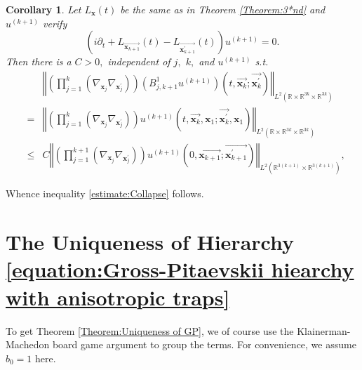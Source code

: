 \documentclass[reqno]{amsart}
\theoremstyle{plain}
\newtheorem{corollary}{Corollary}
\numberwithin{equation}{section}
\begin{document}
\begin{corollary}
Let $L_{\mathbf{x}}(t)$ be the same as in Theorem \ref{Theorem:3*nd} and $u^{(k+1)}$ verify\begin{equation*}
\left( i\partial _{t}+L_{\overrightarrow{\mathbf{x}_{k+1}}}(t)-L_{\overrightarrow{\mathbf{x}_{k+1}^{\prime }}}(t)\right) u^{(k+1)}=0.
\end{equation*}Then there is a $C>0,$ independent of $j,$ $k,$ and $u^{(k+1)}$ s.t. 
\begin{eqnarray*}
&&\left\Vert \left( \prod_{j=1}^{k}\left( \nabla _{\mathbf{x}_{j}}\nabla _{\mathbf{x}_{j}^{\prime }}\right) \right) \left(
B_{j,k+1}^{1}u^{(k+1)}\right) (t,\overrightarrow{\mathbf{x}_{k}};\overrightarrow{\mathbf{x}_{k}^{\prime }})\right\Vert _{L^{2}(\mathbb{R}\times \mathbb{R}^{3k}\times \mathbb{R}^{3k})} \\
&=&\left\Vert \left( \prod_{j=1}^{k}\left( \nabla _{\mathbf{x}_{j}}\nabla _{\mathbf{x}_{j}^{\prime }}\right) \right) u^{(k+1)}(t,\overrightarrow{\mathbf{x}_{k}},\mathbf{x}_{1};\overrightarrow{\mathbf{x}_{k}^{\prime }},\mathbf{x}_{1})\right\Vert _{L^{2}(\mathbb{R}\times \mathbb{R}^{3k}\times \mathbb{R}^{3k})} \\
&\leqslant &C\left\Vert \left( \prod_{j=1}^{k+1}\left( \nabla _{\mathbf{x}_{j}}\nabla _{\mathbf{x}_{j}^{\prime }}\right) \right) u^{(k+1)}(0,\overrightarrow{\mathbf{x}_{k+1}};\overrightarrow{\mathbf{x}_{k+1}^{\prime }})\right\Vert _{L^{2}(\mathbb{R}^{3(k+1)}\times \mathbb{R}^{3(k+1)})},
\end{eqnarray*}
\end{corollary}

Whence inequality \ref{estimate:Collapse} follows.

\section{The Uniqueness of Hierarchy \protect\ref{equation:Gross-Pitaevskii
hiearchy with anisotropic traps}\label{Sec:ProofOfUniqueness}}

To get Theorem \ref{Theorem:Uniqueness of GP}, we of course use the
Klainerman-Machedon board game argument to group the terms. For convenience,
we assume $b_{0}=1$ here.
\end{document}
